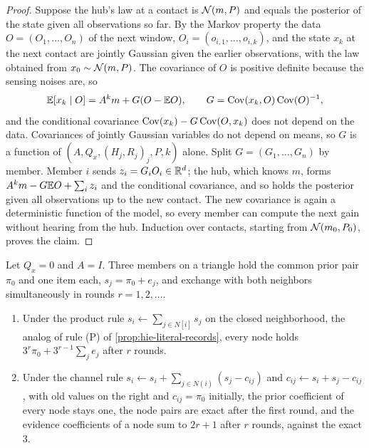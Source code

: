 \begin{proof}
Suppose the hub's law at a contact is $\mathcal{N}(m,P)$ and equals the posterior of the state given all observations so far. By the Markov property the data $O=(O_1,\dots,O_n)$ of the next window, $O_i=(o_{i,1},\dots,o_{i,k})$, and the state $x_k$ at the next contact are jointly Gaussian given the earlier observations, with the law obtained from $x_0\sim\mathcal{N}(m,P)$. The covariance of $O$ is positive definite because the sensing noises are, so
\[
\mathbb{E}[x_k\mid O]=A^km+G(O-\mathbb{E} O),\qquad G=\operatorname{Cov}(x_k,O)\operatorname{Cov}(O)^{-1},
\]
and the conditional covariance $\operatorname{Cov}(x_k)-G\operatorname{Cov}(O,x_k)$ does not depend on the data. Covariances of jointly Gaussian variables do not depend on means, so $G$ is a function of $(A,Q_x,(H_j,R_j)_j,P,k)$ alone. Split $G=(G_1,\dots,G_n)$ by member. Member $i$ sends $z_i=G_iO_i\in\mathbb{R}^d$; the hub, which knows $m$, forms $A^km-G\mathbb{E} O+\sum_iz_i$ and the conditional covariance, and so holds the posterior given all observations up to the new contact. The new covariance is again a deterministic function of the model, so every member can compute the next gain without hearing from the hub. Induction over contacts, starting from $\mathcal{N}(m_0,P_0)$, proves the claim.
\end{proof}

\begin{proposition}\label{prop:prv-ring}
Let $Q_x=0$ and $A=I$. Three members on a triangle hold the common prior pair $\pi_0$ and one item each, $s_j=\pi_0+e_j$, and exchange with both neighbors simultaneously in rounds $r=1,2,\dots$.
\begin{enumerate}
\item[(a)] Under the product rule $s_i\leftarrow\sum_{j\in N[i]}s_j$ on the closed neighborhood, the analog of rule (P) of \cref{prop:hie-literal-records}, every node holds $3^r\pi_0+3^{r-1}\sum_je_j$ after $r$ rounds.
\item[(b)] Under the channel rule $s_i\leftarrow s_i+\sum_{j\in N(i)}(s_j-c_{ij})$ and $c_{ij}\leftarrow s_i+s_j-c_{ij}$, with old values on the right and $c_{ij}=\pi_0$ initially, the prior coefficient of every node stays one, the node pairs are exact after the first round, and the evidence coefficients of a node sum to $2r+1$ after $r$ rounds, against the exact $3$.
\end{enumerate}
\end{proposition}

